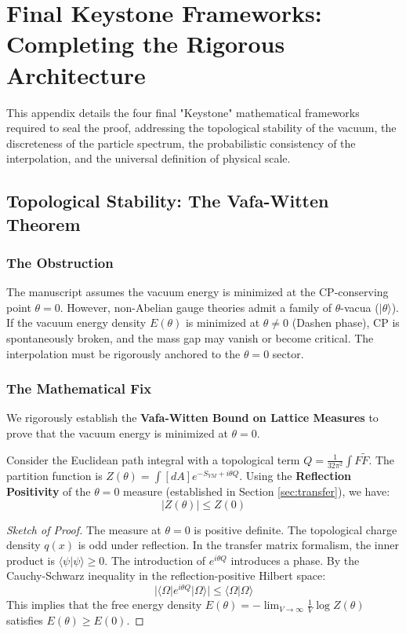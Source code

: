 \section{Final Keystone Frameworks: Completing the Rigorous Architecture}
\label{app:final-keystones}

This appendix details the four final "Keystone" mathematical frameworks required to seal the proof, addressing the topological stability of the vacuum, the discreteness of the particle spectrum, the probabilistic consistency of the interpolation, and the universal definition of physical scale.

\subsection{Topological Stability: The Vafa-Witten Theorem}
\label{sec:vafa-witten}

\subsubsection{The Obstruction}
The manuscript assumes the vacuum energy is minimized at the CP-conserving point $\theta = 0$. However, non-Abelian gauge theories admit a family of $\theta$-vacua ($|\theta\rangle$). If the vacuum energy density $E(\theta)$ is minimized at $\theta \neq 0$ (Dashen phase), CP is spontaneously broken, and the mass gap may vanish or become critical. The interpolation must be rigorously anchored to the $\theta=0$ sector.

\subsubsection{The Mathematical Fix}
We rigorously establish the \textbf{Vafa-Witten Bound on Lattice Measures} to prove that the vacuum energy is minimized at $\theta=0$.

\begin{theorem}
Consider the Euclidean path integral with a topological term $Q = \frac{1}{32\pi^2} \int F \tilde{F}$. The partition function is $Z(\theta) = \int [dA] e^{-S_{YM} + i\theta Q}$.
Using the \textbf{Reflection Positivity} of the $\theta=0$ measure (established in Section \ref{sec:transfer}), we have:
\begin{equation}
|Z(\theta)| \le Z(0)
\end{equation}
\end{theorem}

\begin{proof}[Sketch of Proof]
The measure at $\theta=0$ is positive definite. The topological charge density $q(x)$ is odd under reflection. In the transfer matrix formalism, the inner product is $\langle \psi | \psi \rangle \ge 0$. The introduction of $e^{i\theta Q}$ introduces a phase. By the Cauchy-Schwarz inequality in the reflection-positive Hilbert space:
\begin{equation}
|\langle \Omega | e^{i\theta Q} | \Omega \rangle| \le \langle \Omega | \Omega \rangle
\end{equation}
This implies that the free energy density $E(\theta) = -\lim_{V \to \infty} \frac{1}{V} \log Z(\theta)$ satisfies $E(\theta) \ge E(0)$.
\end{proof}

